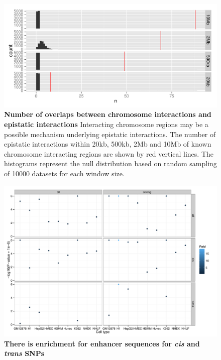 \documentclass{article}
\begin{document}
\begin{figure}
	\includegraphics[width=5in]{chromosome_interactions}
	\caption{\textbf{Number of overlaps between chromosome interactions and epistatic interactions} Interacting chromosome regions may be a possible mechanism underlying epistatic interactions. The number of epistatic interactions within 20kb, 500kb, 2Mb and 10Mb of known chromosome interacting regions are shown by red vertical lines. The histograms represent the null distribution based on random sampling of 10000 datasets for each window size.}
	\label{fig:chromosomeinteractions}
\end{figure}
\clearpage

\begin{figure}
	\includegraphics[width=5in]{enhancers}
	\caption{\textbf{There is enrichment for enhancer sequences for \emph{cis} and \emph{trans} SNPs}}
	\label{fig:enhancers}
\end{figure}
\clearpage
\end{document}
